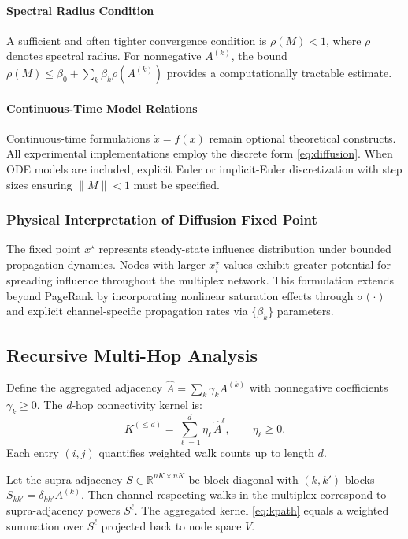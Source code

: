 \documentclass[12pt]{article}
\theoremstyle{plain}
\begin{document}
\paragraph{Spectral Radius Condition}
A sufficient and often tighter convergence condition is $\rho(M)<1$, where $\rho$ denotes spectral radius. For nonnegative $A^{(k)}$, the bound $\rho(M)\le \beta_0 + \sum_k \beta_k \rho(A^{(k)})$ provides a computationally tractable estimate.

\paragraph{Continuous-Time Model Relations}
Continuous-time formulations $\dot{x}=f(x)$ remain optional theoretical constructs. All experimental implementations employ the discrete form \eqref{eq:diffusion}. When ODE models are included, explicit Euler or implicit-Euler discretization with step sizes ensuring $\|M\|<1$ must be specified.

\subsubsection*{Physical Interpretation of Diffusion Fixed Point}
The fixed point $x^\star$ represents steady-state influence distribution under bounded propagation dynamics. Nodes with larger $x^\star_i$ values exhibit greater potential for spreading influence throughout the multiplex network. This formulation extends beyond PageRank by incorporating nonlinear saturation effects through $\sigma(\cdot)$ and explicit channel-specific propagation rates via $\{\beta_k\}$ parameters.

\subsection{Recursive Multi-Hop Analysis}
Define the aggregated adjacency $\widehat{A}=\sum_{k} \gamma_k A^{(k)}$ with nonnegative coefficients $\gamma_k\ge0$. The $d$-hop connectivity kernel is:
\begin{equation}
\label{eq:kpath}
K^{(\le d)}=\sum_{\ell=1}^{d} \eta_\ell\, \widehat{A}^{\ell},\qquad \eta_\ell\ge 0.
\end{equation}
Each entry $(i,j)$ quantifies weighted walk counts up to length $d$.

\begin{proposition}
Let the supra-adjacency $S\in\mathbb{R}^{nK\times nK}$ be block-diagonal with $(k,k')$ blocks $S_{kk'}=\delta_{kk'}A^{(k)}$. Then channel-respecting walks in the multiplex correspond to supra-adjacency powers $S^\ell$. The aggregated kernel \eqref{eq:kpath} equals a weighted summation over $S^\ell$ projected back to node space $V$.
\end{proposition}
\end{document}
